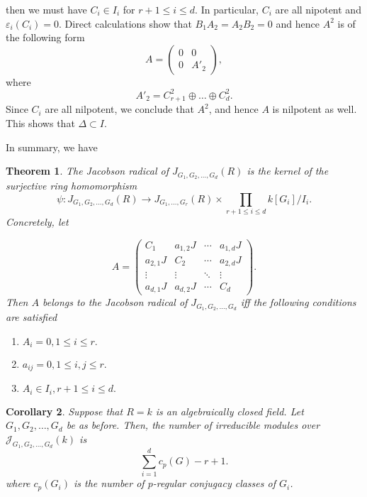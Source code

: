 \documentclass[12pt, a4paper]{amsart}
\numberwithin{equation}{section} %
\theoremstyle{plain}
\newtheorem{thm}{Theorem}[section]
\theoremstyle{definition}
\theoremstyle{plain}
\newtheorem{cor}[thm]{Corollary}
\theoremstyle{remark}
\newcommand{\ones}{J}
\newcommand{\sJ}{\mathcal{J}}
\begin{document}
then we must have $C_i \in I_i$ for $r+1 \leq i \leq d.$ In particular, $C_i$ are all nipotent and $\varepsilon_i(C_i)=0.$ Direct calculations show that $B_1A_2=A_2B_2=0$ and hence $A^2$ is of the following form 
\[ A =\begin{pmatrix} 0 & 0 \\ 0 & A'_2 \end{pmatrix} ,\]
where 
\[ A'_2=C_{r+1}^2 \oplus \ldots \oplus C_{d}^2 .\] 
Since $C_i$ are all nilpotent, we conclude that $A^2$, and hence $A$ is nilpotent as well. This shows that $\Delta \subset I.$ 

In summary, we have 
\begin{thm} \label{thm:jacobson}
The Jacobson radical of $J_{G_1, G_2, \ldots, G_d}(R)$ is the kernel of the surjective ring homomorphism 
\[ \psi: J_{G_1, G_2, \ldots, G_d}(R) \to J_{G_1, \ldots, G_r}(R) \times \prod_{r+1 \leq i \leq d} k[G_i]/I_i .\]
Concretely, let 

\begin{equation*}
A=\left(\begin{array}{c|c|c|c}
C_1 & a_{1,2}\ones & \cdots & a_{1,d}\ones \\
\hline
a_{2,1}\ones & C_2 & \cdots & a_{2,d}\ones \\
\hline
\vdots & \vdots & \ddots & \vdots \\
\hline
a_{d,1}\ones & a_{d,2}\ones & \cdots & C_d
\end{array}\right).
\end{equation*}
Then $A$ belongs to the Jacobson radical of $J_{G_1, G_2, \ldots, G_d}$ iff the following conditions are satisfied 
\begin{enumerate}
    \item $A_i=0, 1 \leq i \leq r.$ 
    \item $a_{ij}=0, 1 \leq i,j \leq r.$ 
    \item $A_i \in I_i, r+1 \leq i \leq d.$
\end{enumerate}
\end{thm}

\begin{cor}
Suppose that $R=k$ is an algebraically closed field. Let $G_1, G_2, \ldots, G_d$ be as before. Then, the number of irreducible modules over $\sJ_{G_1, G_2, \ldots, G_d}(k)$ is 
\[ \sum_{i=1}^{d} c_p(G)- r +1 .\] 
where $c_p(G_i)$ is the number of $p$-regular conjugacy classes of $G_i$.
\end{cor}
\end{document}
